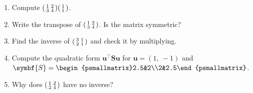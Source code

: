 \documentclass[11pt,a4paper,oneside,openany]{book}
\newcommand{\B}[1]{{\symbf{#1}}}
\newcommand{\B}[1]{{\bm{#1}}}
\newcommand{\T}{^{\top}}
\newcommand{\vu}{\B{u}}
\newcommand{\mS}{\B{S}}
\begin{document}
\begin{checkyourself}
\begin{enumerate}
\item Compute $\begin{psmallmatrix}1&2\\3&4\end{psmallmatrix}\begin{psmallmatrix}1\\1\end{psmallmatrix}$.
\item Write the transpose of $\begin{psmallmatrix}1&2\\3&4\end{psmallmatrix}$. Is the matrix symmetric?
\item Find the inverse of $\begin{psmallmatrix}3&1\\2&1\end{psmallmatrix}$ and check it by multiplying.
\item Compute the quadratic form $\vu\T\mS\vu$ for $\vu=(1,\ -1)$ and $\mS=\begin{psmallmatrix}2.5&2\\2&2.5\end{psmallmatrix}$.
\item Why does $\begin{psmallmatrix}1&2\\2&4\end{psmallmatrix}$ have no inverse?
\end{enumerate}
\end{checkyourself}
\end{document}
